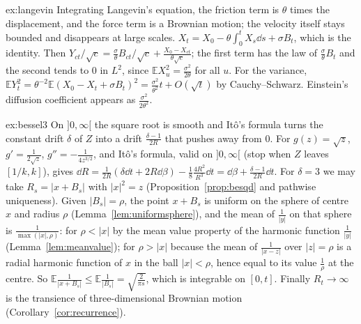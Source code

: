\begin{solution}{ex:langevin}
\idea Integrating Langevin's equation, the friction term is $\theta$ times the displacement, and the force term is a Brownian motion; the velocity itself stays bounded and disappears at large scales.
\writeup $X_t=X_0-\theta\int_0^tX_s\dd s+\sigma B_t$, which is the identity. Then $Y_{ct}/\sqrt c=\frac\sigma\theta B_{ct}/\sqrt c+\frac{X_0-X_{ct}}{\theta\sqrt c}$; the first term has the law of $\frac\sigma\theta B_t$ and the second
tends to $0$ in $L^2$, since $\mathbb EX_u^2=\frac{\sigma^2}{2\theta}$ for all $u$. For the variance, $\mathbb EY_t^2=\theta^{-2}\mathbb E(X_0-X_t+\sigma B_t)^2=\frac{\sigma^2}{\theta^2}t+O(\sqrt t)$ by Cauchy--Schwarz. Einstein's
diffusion coefficient appears as $\frac{\sigma^2}{2\theta^2}$.
\end{solution}

\begin{solution}{ex:bessel3}
\idea On $]0,\infty[$ the square root is smooth and It\^o's formula turns the constant drift $\delta$ of $Z$ into a drift $\frac{\delta-1}{2R}$ that pushes away from $0$.
\writeup For $g(z)=\sqrt z$, $g'=\frac1{2\sqrt z}$, $g''=-\frac1{4z^{3/2}}$, and It\^o's formula, valid on $]0,\infty[$ (stop when $Z$ leaves $[1/k,k]$), gives
$\dd R=\frac1{2R}(\delta\dd t+2R\dd\beta)-\frac18\frac{4R^2}{R^3}\dd t=\dd\beta+\frac{\delta-1}{2R}\dd t$. For $\delta=3$ we may take $R_s=|x+B_s|$ with $|x|^2=z$ (Proposition~\ref{prop:besqd} and pathwise uniqueness).
Given $|B_s|=\rho$, the point $x+B_s$ is uniform on the sphere of centre $x$ and radius $\rho$ (Lemma~\ref{lem:uniformsphere}), and the mean of $\frac1{|y|}$ on that sphere is $\frac1{\max(|x|,\rho)}$: for $\rho<|x|$ by the
mean value property of the harmonic function $\frac1{|y|}$ (Lemma~\ref{lem:meanvalue}); for $\rho>|x|$ because the mean of $\frac1{|x-z|}$ over $|z|=\rho$ is a radial harmonic function of $x$ in the ball $|x|<\rho$, hence
equal to its value $\frac1\rho$ at the centre. So $\mathbb E\frac1{|x+B_s|}\le\mathbb E\frac1{|B_s|}=\sqrt{\frac2{\pi s}}$, which is integrable on $[0,t]$. Finally $R_t\to\infty$ is the transience of three-dimensional Brownian motion (Corollary~\ref{cor:recurrence}).
\end{solution}

